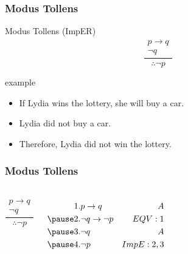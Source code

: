 \documentclass[dvipsnames]{beamer}
\begin{document}
\begin{frame}
  \frametitle{Modus Tollens}

  \begin{block}{Modus Tollens (ImpER)}
    \[
    \frac
      {
        \begin{array}{c}
          p \rightarrow q\\
          \neg q
        \end{array}
      }
      {
        \therefore \neg p
      }
    \]
  \end{block}

  \pause
  \begin{exampleblock}{example}
    \begin{itemize}
      \item If Lydia wins the lottery, she will buy a car.
      \item Lydia did not buy a car.

      \medskip
      \item Therefore, Lydia did not win the lottery.
    \end{itemize}
  \end{exampleblock}
\end{frame}

\begin{frame}
  \frametitle{Modus Tollens}

  \begin{columns}
    \[
    \frac
      {
        \begin{array}{c}
          p \rightarrow q\\
          \neg q
        \end{array}
      }
      {
        \therefore \neg p
      }
    \]

    \pause
    \begin{eqnarray*}
      1. & p \rightarrow q           & A\\
      \pause
      2. & \neg q \rightarrow \neg p & EQV: 1\\
      \pause
      3. & \neg q                    & A\\
      \pause
      4. & \neg p                    & ImpE:2,3\\
    \end{eqnarray*}
  \end{columns}
\end{frame}
\end{document}

